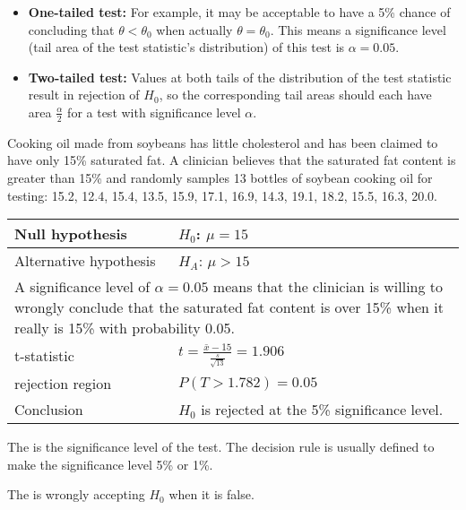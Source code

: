 \begin{itemize}
    \item \textbf{One-tailed test:} For example, it may be acceptable to have a 5\% chance of concluding that $\theta<\theta_0$ when actually $\theta=\theta_0$. This means a significance level (tail area of the test statistic's distribution) of this test is $\alpha=0.05$.
    \item \textbf{Two-tailed test:} Values at both tails of the distribution of the test statistic result in rejection of $H_0$, so the corresponding tail areas should each have area $\frac{\alpha}{2}$ for a test with significance level $\alpha$.
\end{itemize}

\begin{example}
    Cooking oil made from soybeans has little cholesterol and has been claimed to have only 15\% saturated fat. A clinician believes that the saturated fat content is greater than 15\% and randomly samples 13 bottles of soybean cooking oil for testing: 15.2, 12.4, 15.4, 13.5, 15.9, 17.1, 16.9, 14.3, 19.1, 18.2, 15.5, 16.3, 20.0.
    \begin{center}
        \begin{tabular}{p{4cm}|p{7cm}}
        Null hypothesis & $H_0$: $\mu=15$ \\
        \hline
        Alternative hypothesis & $H_A$: $\mu > 15$ \\
        \hline
        \multicolumn{2}{p{11cm}}{A significance level of $\alpha=0.05$ means that the clinician is willing to wrongly conclude that the saturated fat content is over 15\% when it really is 15\% with probability 0.05.} \\
        \hline
        t-statistic & $t=\frac{\bar{x}-15}{\frac{s}{\sqrt{13}}} = 1.906$ \\
        \hline
        rejection region & $P(T>1.782) = 0.05$ \\
        \hline
        Conclusion & $H_0$ is rejected at the 5\% significance level.
    \end{tabular}
    \end{center}
\end{example}

\begin{definition}
    The  is the significance level of the test. The decision rule is usually defined to make the significance level 5\% or 1\%.
    
    The  is wrongly accepting $H_0$ when it is false.
\end{definition}

